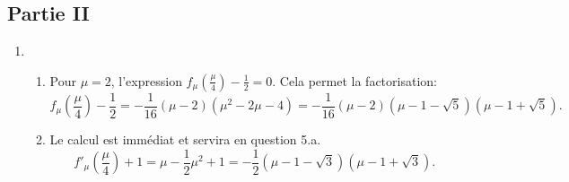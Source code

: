 \subsection*{Partie II}
\begin{enumerate}
 \item \begin{enumerate}
 \item Pour  $\mu=2$, l'expression $f_\mu(\frac{\mu}{4})-\frac{1}{2} = 0$. Cela permet la factorisation:
\begin{displaymath}
 f_\mu(\frac{\mu}{4})-\frac{1}{2} = -\frac{1}{16}(\mu-2)(\mu^2-2\mu-4)
= - \frac{1}{16}(\mu-2)(\mu -1-\sqrt{5})(\mu -1+\sqrt{5}).
\end{displaymath}
 
\item Le calcul est immédiat et servira en question 5.a.
\begin{displaymath}
 f'_\mu(\frac{\mu}{4})+1=\mu - \frac{1}{2}\mu^2 + 1 = -\frac{1}{2}(\mu-1-\sqrt{3})(\mu-1+\sqrt{3}).
\end{displaymath}
\end{enumerate}
 

\end{enumerate}
